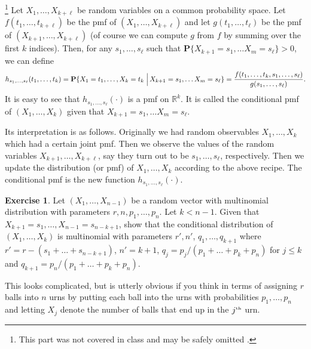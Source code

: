 \documentclass[preprint,  11pt]{amsart}
\newcommand{\para}[1]{\vspace{4mm}\noindent{\bfseries #1:}}
\theoremstyle{plain} %
\theoremstyle{definition} %
\newtheorem{exercise}[theorem]{Exercise}
\begin{document}
{\color{magenta}
\para{Conditioning on random variables}\footnote{This part was not covered in class and may be safely omitted .} 
Let $X_{1},\ldots ,X_{k+\ell}$ be random variables on a common probability space. Let $f(t_{1},\ldots ,t_{k+\ell})$ be the pmf of $(X_{1},\ldots ,X_{k+\ell})$ and let $g(t_{1},\ldots ,t_{\ell})$ be the pmf of $(X_{k+1},\ldots ,X_{k+\ell})$ (of course we can compute $g$ from $f$ by summing over the first $k$ indices). Then, for any $s_{1},\ldots ,s_{\ell}$ such that $\mathbf{P}\{X_{k+1}=s_{1},\ldots X_{m}=s_{\ell}\}>0$, we can define
\begin{equation}\label{eq:conditionalpmf}
h_{s_{1},\ldots ,s_{\ell}}(t_{1},\ldots,t_{k})=\mathbf{P}\{X_{1}= t_{1},\ldots ,X_{k}= t_{k}\left.\vphantom{\hbox{\Large (}}\right| X_{k+1}=s_{1},\ldots X_{m}=s_{\ell}\}=\frac{f(t_{1},\ldots ,t_{k},s_{1},\ldots ,s_{\ell})}{g(s_{1},\ldots ,s_{\ell})}.
\end{equation}
It is easy to see that $h_{s_{1},\ldots,s_{\ell}}(\cdot)$ is a pmf on $\mathbb{R}^{k}$. It is called the conditional pmf of $(X_{1},\ldots ,X_{k})$ given that $X_{k+1}=s_{1},\ldots X_{m}=s_{\ell}$. 

Its interpretation is as follows. Originally we had random observables $X_{1},\ldots ,X_{k}$ which had a certain joint pmf. Then we observe the values of the random variables $X_{k+1},\ldots ,X_{k+\ell}$, say they turn out to be $s_{1},\ldots ,s_{\ell}$, respectively. Then we update the distribution (or pmf) of $X_{1},\ldots ,X_{k}$ according to the above recipe. The conditional pmf is the new function $h_{s_{1},\ldots,s_{\ell}}(\cdot)$.

\begin{exercise} Let $(X_{1},\ldots ,X_{n-1})$ be a random vector with multinomial distribution with parameters $r,n,p_{1},\ldots ,p_{n}$. Let $k<n-1$. Given that $X_{k+1}=s_{1},\ldots ,X_{n-1}=s_{n-k+1}$, show that the conditional distribution of $(X_{1},\ldots ,X_{k})$ is multinomial with parameters $r',n'$, $q_{1},\ldots ,q_{k+1}$ where $r'=r-(s_{1}+\ldots +s_{n-k+1})$, $n'=k+1$, $q_{j}=p_{j}/(p_{1}+\ldots +p_{k}+p_{n})$ for $j\le k$ and $q_{k+1}=p_{n}/(p_{1}+\ldots +p_{k}+p_{n})$.

This looks complicated, but is utterly obvious if you think in terms of assigning $r$ balls into $n$ urns by putting each ball into the urns with probabilities $p_{1},\ldots ,p_{n}$ and letting $X_{j}$ denote the number of balls that end up in the $j^{\mbox{\tiny th}}$ urn.
\end{exercise}

}
\end{document}

